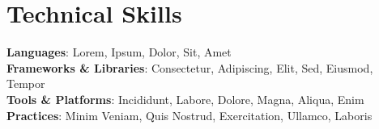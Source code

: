 
\section{Technical Skills}
\begin{itemize}[leftmargin=0.15in, label={}]
  \small{\item{
        \textbf{Languages}{: Lorem, Ipsum, Dolor, Sit, Amet} \\
        \textbf{Frameworks \& Libraries}{: Consectetur, Adipiscing, Elit, Sed, Eiusmod, Tempor} \\
        \textbf{Tools \& Platforms}{: Incididunt, Labore, Dolore, Magna, Aliqua, Enim} \\
        \textbf{Practices}{: Minim Veniam, Quis Nostrud, Exercitation, Ullamco, Laboris}
        }}
\end{itemize}
